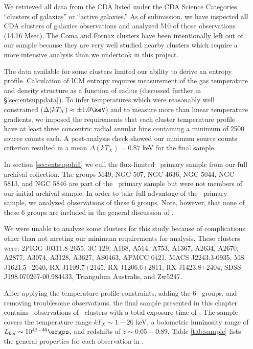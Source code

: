 We retrieved all data from the CDA listed under the CDA Science
Categories ``clusters of galaxies'' or ``active galaxies.'' As of
submission, we have inspected all CDA clusters of galaxies
observations and analyzed 510 of those observations (14.16 Msec). The
Coma and Fornax clusters have been intentionally left out of our
sample because they are very well studied nearby clusters which
require a more intensive analysis than we undertook in this project.

The data available for some clusters limited our ability to derive an
entropy profile. Calculation of ICM entropy requires measurement of
the gas temperature and density structure as a function of radius
(discussed further in \S\ref{sec:entsuppdata}). To infer temperatures which
were reasonably well constrained ($\Delta (kT_X) \approx \pm 1.0
\keV$) and to measure more than linear temperature gradients, we
imposed the requirements that each cluster temperature profile have at
least three concentric radial annular bins containing a minimum of
2500 source counts each. A post-analysis check showed our minimum
source counts criterion resulted in a mean $\Delta (kT_X) = 0.87$ keV
for the final sample.

In section \ref{sec:entsupphifl} we cull the flux-limited \hifl\ primary
sample \citep{hiflugcs1, hiflugcs2} from our full archival
collection. The groups M49, NGC 507, NGC 4636, NGC 5044, NGC 5813, and
NGC 5846 are part of the \hifl\ primary sample but were not members of
our initial archival sample. In order to take full advantage of the
\hifl\ primary sample, we analyzed observations of these 6
groups. Note, however, that none of these 6 groups are included in the
general discussion of
\accept.

We were unable to analyze some clusters for this study because of
complications other than not meeting our minimum requirements for
analysis. These clusters were: 2PIGG J0311.8-2655, 3C 129, A168, A514,
A753, A1367, A2634, A2670, A2877, A3074, A3128, A3627, AS0463, APMCC
0421, MACS J2243.3-0935, MS J1621.5+2640, RX J1109.7+2145, RX
J1206.6+2811, RX J1423.8+2404, SDSS J198.070267-00.984433, Triangulum
Australis, and Zw5247.

After applying the temperature profile constraints, adding the 6
\hifl\ groups, and removing troublesome observations, the final sample
presented in this chapter contains \entsuppobs\ observations of
\entsuppnum\ clusters with a total exposure time of \expt. The sample
covers the temperature range $kT_X \sim 1-20$ keV, a bolometric
luminosity range of $L_{bol} \sim 10^{42-46} \ergps$, and redshifts of
$z \sim 0.05-0.89$. Table \ref{tab:sample} lists the general
properties for each observation in \accept.

